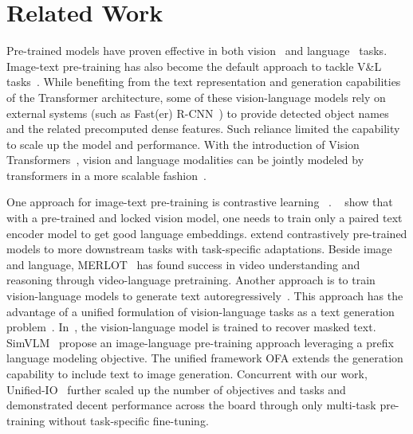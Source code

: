 \documentclass{article}
\begin{document}
\section{Related Work}
Pre-trained models have proven effective in both vision~\citep{dosovitskiy-2021-vit,zhai-21-scalingvit} and language~\citep{2020t5,brown2020gpt} tasks.
Image-text pre-training has also become the default approach to tackle V\&L tasks~\citep{tan2019lxmert,chen2020uniter,zhang2021vinvl,cho2021vlt5,lemon}.
While benefiting from the text representation and generation capabilities of the Transformer architecture, some of these vision-language models rely on external systems (such as Fast(er) R-CNN~\citep{ren2015faster}) to provide detected object names and the related precomputed dense features.
Such reliance limited the capability to scale up the model and performance. 
With the introduction of Vision Transformers~\citep{dosovitskiy-2021-vit}, vision and language modalities can be jointly modeled by transformers in a more scalable fashion~\citep{florence,coca,git,flamingo}.

One approach for image-text pre-training is contrastive learning ~\citep{clip,align}.
~\citet{lit} show that with a pre-trained and locked vision model, one needs to train only a paired text encoder model to get good language embeddings.
\citet{florence} extend contrastively pre-trained models to more downstream tasks
with task-specific adaptations. 
Beside image and language, MERLOT~\citep{zellers2021merlot} has found success in video understanding and reasoning through video-language pretraining. Another approach is to train vision-language models to generate text autoregressively~\citep{donahue2015long,vinyals2015show}. This approach has the advantage of a unified formulation of vision-language tasks as a text generation problem~\citep{cho2021vlt5,wang2022ofa,piergiovanni2022answerme}. In~\cite{cho2021vlt5}, the vision-language model is trained to recover masked text. SimVLM~\citep{simvlm} propose an image-language pre-training approach leveraging a prefix language modeling objective. The unified framework OFA \citep{wang2022ofa} extends the generation capability to include text to image generation. Concurrent with our work, Unified-IO~\citep{lu2022unified} further scaled up the number of objectives and tasks and demonstrated decent performance across the board through only multi-task pre-training without task-specific fine-tuning.
\end{document}
